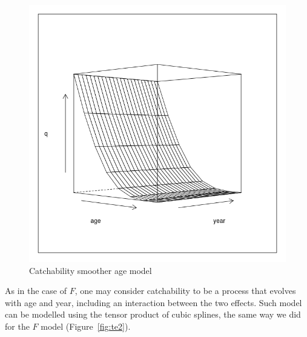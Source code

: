 \documentclass[a4paper,english,10pt]{article}\usepackage[]{graphicx}\usepackage[]{color}
\makeatletter
\def\maxwidth{ %
  \ifdim\Gin@nat@width>\linewidth
    \linewidth
  \else
    \Gin@nat@width
  \fi
}
\newenvironment{knitrout}{}{} %
\makeatother
\begin{document}
\begin{knitrout}
\color{fgcolor}\begin{figure}[H]

{\centering \includegraphics[width=\maxwidth]{figure/smoothage-1} 

}

\caption[Catchability smoother age model]{Catchability smoother age model}\label{fig:smoothage}
\end{figure}


\end{knitrout}

As in the case of $F$, one may consider catchability to be a process that evolves with age and year, including an interaction between the two effects. Such model can be modelled using the tensor product of cubic splines, the same way we did for the $F$ model (Figure~\ref{fig:te2}).
\end{document}
